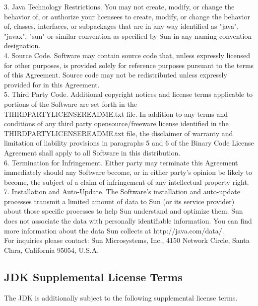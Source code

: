 {   3. Java Technology Restrictions. You may not create, modify, or
   change the behavior of, or authorize your licensees to create,
   modify, or change the behavior of, classes, interfaces, or
   subpackages that are in any way identified as "java", "javax",
   "sun" or similar convention as specified by Sun in any naming
   convention designation.
\\[4pt]
   4. Source Code. Software may contain source code that, unless
   expressly licensed for other purposes, is provided solely for
   reference purposes pursuant to the terms of this Agreement. Source
   code may not be redistributed unless expressly provided for in this
   Agreement.
\\[4pt]
   5. Third Party Code. Additional copyright notices and license terms
   applicable to portions of the Software are set forth in the
   THIRDPARTYLICENSEREADME.txt file. In addition to any terms and
   conditions of any third party opensource/freeware license
   identified in the THIRDPARTYLICENSEREADME.txt file, the disclaimer
   of warranty and limitation of liability provisions in paragraphs 5
   and 6 of the Binary Code License Agreement shall apply to all
   Software in this distribution.
\\[4pt]
   6. Termination for Infringement. Either party may terminate this
   Agreement immediately should any Software become, or in either
   party's opinion be likely to become, the subject of a claim of
   infringement of any intellectual property right.
\\[4pt]
   7. Installation and Auto-Update. The Software's installation and
   auto-update processes transmit a limited amount of data to Sun (or
   its service provider) about those specific processes to help Sun
   understand and optimize them. Sun does not associate the data with
   personally identifiable information. You can find more information
   about the data Sun collects at http://java.com/data/.
\\[4pt]
For inquiries please contact: Sun Microsystems, Inc., 4150 Network
Circle, Santa Clara, California 95054, U.S.A.
}


\subsection{JDK Supplemental License Terms}

\setlength{\baselineskip}{\oldbaselineskip}
\noindent
The JDK is additionally subject to the following supplemental license terms.
\\

